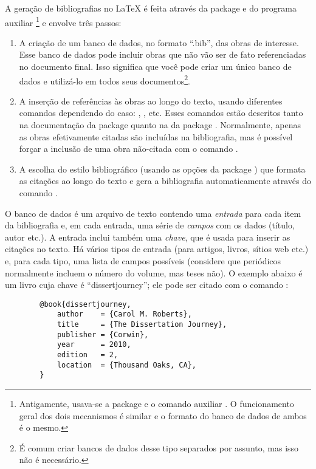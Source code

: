 A geração de bibliografias no \LaTeX{} é feita através da package
 e do programa auxiliar
\footnote{Antigamente, usava-se a package
 e o comando auxiliar .
O funcionamento geral dos dois mecanismos é similar e o formato do banco
de dados de ambos é o mesmo.} e envolve três passos:

\enlargethispage{\baselineskip}

\begin{enumerate}
\item A criação de um banco de dados, no formato ``.bib'', das obras de
interesse. Esse banco de dados pode incluir obras que não vão ser de fato
referenciadas no documento final. Isso significa que você pode criar um
único banco de dados e utilizá-lo em todos seus documentos\footnote{É
comum criar bancos de dados desse tipo separados por assunto, mas isso
não é necessário.}.

\item A inserção de referências às obras ao longo do texto, usando
diferentes comandos dependendo do caso: , ,
 etc. Esses comandos estão descritos tanto na documentação
da package  quanto na da package
. Normalmente, apenas as obras efetivamente
citadas são incluídas na bibliografia, mas é possível forçar a inclusão
de uma obra não-citada com o comando .

\item A escolha do estilo bibliográfico (usando as opções da package
) que formata as citações ao longo do texto e gera a bibliografia
automaticamente através do comando .
\end{enumerate}

O banco de dados é um arquivo de texto contendo uma \emph{entrada} para cada
item da bibliografia e, em cada entrada, uma série de \emph{campos} com os
dados (título, autor etc.). A entrada inclui também uma \emph{chave}, que é
usada para inserir as citações no texto. Há vários tipos de entrada (para
artigos, livros, sítios web etc.) e, para cada tipo, uma lista de campos
possíveis (considere que periódicos normalmente incluem o número do volume,
mas teses não). O exemplo abaixo é um livro cuja chave é ``dissertjourney'';
ele pode ser citado com o comando :

\begin{verbatim}
        @book{dissertjourney,
            author    = {Carol M. Roberts},
            title     = {The Dissertation Journey},
            publisher = {Corwin},
            year      = 2010,
            edition   = 2,
            location  = {Thousand Oaks, CA},
        }
\end{verbatim}

